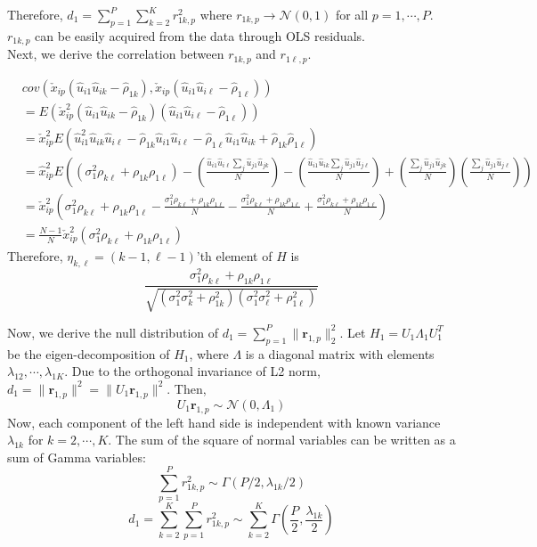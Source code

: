 \documentclass[aoas,authoryear, preprint]{imsart}
\numberwithin{equation}{section}
\theoremstyle{plain}
\begin{document}
\noindent Therefore, $d_1 = \sum_{p=1}^{P}\sum_{k=2}^{K}  r_{1k,p}^2$ where $r_{1k,p} \rightarrow \mathcal{N}(0,1)$ for all $p = 1, \cdots, P$. $r_{1k,p}$ can be easily acquired from the data through OLS residuals.\\

Next, we derive the correlation between $r_{1k,p}$ and $r_{1\ell,p}$. 

\begin{align*}
    &cov(\check{x}_{ip} (\hat{u}_{i1}\hat{u}_{ik} - \hat{\rho}_{1k}),
    \check{x}_{ip} (\hat{u}_{i1}\hat{u}_{i\ell} - \hat{\rho}_{1\ell})) \\
    &= E(\check{x}_{ip}^2 (\hat{u}_{i1}\hat{u}_{ik} - \hat{\rho}_{1k})(\hat{u}_{i1}\hat{u}_{i\ell} - \hat{\rho}_{1\ell}))\\
    &= \check{x}_{ip}^2 E(\hat{u}_{i1}^2\hat{u}_{ik}\hat{u}_{i\ell} - \hat{\rho}_{1k}\hat{u}_{i1}\hat{u}_{i\ell} - \hat{\rho}_{1\ell}\hat{u}_{i1}\hat{u}_{ik} + \hat{\rho}_{1k}\hat{\rho}_{1\ell})\\
    &= \hat{x}_{ip}^2E((\sigma_{1}^2\rho_{k\ell} + \rho_{1k}\rho_{1\ell})-
    (\frac{\hat{u}_{i1}\hat{u}_{i\ell}\sum_{j} \hat{u}_{j1}\hat{u}_{jk}}{N})  - 
    (\frac{\hat{u}_{i1}\hat{u}_{ik}\sum_{j} \hat{u}_{j1}\hat{u}_{j\ell}}{N})
     + (\frac{\sum_{j} \hat{u}_{j1}\hat{u}_{jk}}{N})(\frac{\sum_{j} \hat{u}_{j1}\hat{u}_{j\ell}}{N}))\\
    &= \check{x}_{ip}^2 \left(\sigma_1^2\rho_{k\ell}+\rho_{1k}\rho_{1\ell} - \frac{\sigma_1^2\rho_{k\ell}+\rho_{1k}\rho_{1\ell}}{N} - \frac{\sigma_1^2\rho_{k\ell} + \rho_{1k}\rho_{1\ell}}{N}
    + \frac{\sigma_1^2\rho_{k\ell} + \rho_{1k}\rho_{1\ell}}{N}
    \right)\\
    &= \frac{N-1}{N} \check{x}_{ip}^2(\sigma_1^2\rho_{k\ell}+\rho_{1k}\rho_{1\ell})
\end{align*}
Therefore, $\eta_{k,\ell} = (k-1, \ell-1)$'th element of $H$ is
$$\frac{\sigma_1^2\rho_{k\ell} + \rho_{1k}\rho_{1\ell}}{\sqrt{({\sigma}_1^2{\sigma}_k^2+{\rho}_{1k}^2)({\sigma}_1^2{\sigma}_\ell^2+{\rho}_{1\ell}^2)}}$$

Now, we derive the null distribution of $d_1 = \sum_{p=1}^{P}\|\bm{r}_{1,p}\|_2^2$. Let $H_1 = U_1\Lambda_1U_1^T$ be the eigen-decomposition of $H_1$, where $\Lambda$ is a diagonal matrix with elements $\lambda_{12}, \cdots, \lambda_{1K}$. Due to the orthogonal invariance of L2 norm, $d_1 = \| \bm{r}_{1,p}\|^2 = \|U_1\bm{r}_{1,p}\|^2$. Then, 
$$U_1\bm{r}_{1,p} \sim \mathcal{N}(0, \Lambda_1)$$
Now, each component of the left hand side is independent with known variance $\lambda_{1k}$ for $k = 2, \cdots, K$. The sum of the square of normal variables can be written as a sum of Gamma variables:
$$\sum_{p=1}^{P} r_{1k,p}^2 \sim \Gamma\left(P/2, \lambda_{1k}/2\right)$$
$$d_1 = \sum_{k=2}^{K}\sum_{p=1}^P  r_{1k,p}^2 \sim \sum_{k=2}^{K} \Gamma\left( \frac{P}{2}, \frac{\lambda_{1k}}{2}\right)$$
\end{document}
